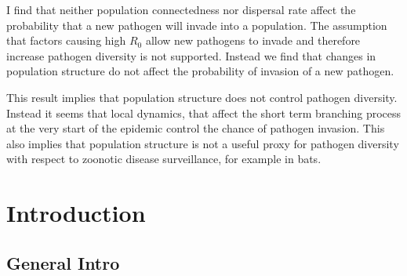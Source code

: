 I find that neither population connectedness nor dispersal rate affect the probability that a new pathogen will invade into a population.
The assumption that factors causing high $R_0$ allow new pathogens to invade and therefore increase pathogen diversity is not supported.
Instead we find that changes in population structure do not affect the probability of invasion of a new pathogen.
 

This result implies that population structure does not control pathogen diversity.
Instead it seems that local dynamics, that affect the short term branching process at the very start of the epidemic control the chance of pathogen invasion.
This also implies that population structure is not a useful proxy for pathogen diversity with respect to zoonotic disease surveillance, for example in bats.








\clearpage
\section{Introduction}





\subsection{General Intro}


